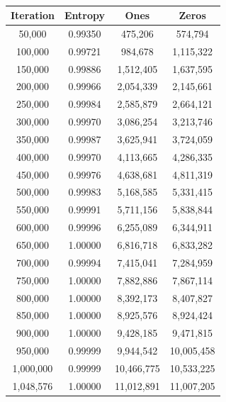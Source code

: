 \documentclass[letterpaper]{article}
\begin{document}
\begin{multicols}{2}
    \begin{table}[th]
        \centering
        \begin{tabular}{|c|c|c|c|}
            \hline
            \textbf{Iteration} & \textbf{Entropy} & \textbf{Ones} & \textbf{Zeros} \\
            \hline
            50,000             & 0.99350          & 475,206       & 574,794        \\
            100,000            & 0.99721          & 984,678       & 1,115,322      \\
            150,000            & 0.99886          & 1,512,405     & 1,637,595      \\
            200,000            & 0.99966          & 2,054,339     & 2,145,661      \\
            250,000            & 0.99984          & 2,585,879     & 2,664,121      \\
            300,000            & 0.99970          & 3,086,254     & 3,213,746      \\
            350,000            & 0.99987          & 3,625,941     & 3,724,059      \\
            400,000            & 0.99970          & 4,113,665     & 4,286,335      \\
            450,000            & 0.99976          & 4,638,681     & 4,811,319      \\
            500,000            & 0.99983          & 5,168,585     & 5,331,415      \\
            550,000            & 0.99991          & 5,711,156     & 5,838,844      \\
            600,000            & 0.99996          & 6,255,089     & 6,344,911      \\
            650,000            & 1.00000          & 6,816,718     & 6,833,282      \\
            700,000            & 0.99994          & 7,415,041     & 7,284,959      \\
            750,000            & 1.00000          & 7,882,886     & 7,867,114      \\
            800,000            & 1.00000          & 8,392,173     & 8,407,827      \\
            850,000            & 1.00000          & 8,925,576     & 8,924,424      \\
            900,000            & 1.00000          & 9,428,185     & 9,471,815      \\
            950,000            & 0.99999          & 9,944,542     & 10,005,458     \\
            1,000,000          & 0.99999          & 10,466,775    & 10,533,225     \\
            1,048,576          & 1.00000          & 11,012,891    & 11,007,205     \\
            \hline
        \end{tabular}
        \caption{}
    \end{table}


\end{multicols}
\end{document}
